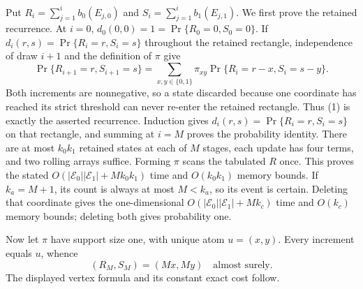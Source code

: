Put \(R_i=\sum_{j=1}^i b_0(E_{j,0})\) and \(S_i=\sum_{j=1}^i b_1(E_{j,1})\). We first prove the retained recurrence. At \(i=0\), \(d_0(0,0)=1=\Pr\{R_0=0,S_0=0\}\). If \(d_i(r,s)=\Pr\{R_i=r,S_i=s\}\) throughout the retained rectangle, independence of draw \(i+1\) and the definition of \(\pi\) give
\[
\Pr\{R_{i+1}=r,S_{i+1}=s\}=\sum_{x,y\in\{0,1\}}\pi_{xy}\Pr\{R_i=r-x,S_i=s-y\}.
\tag{1}
\]
Both increments are nonnegative, so a state discarded because one coordinate has reached its strict threshold can never re-enter the retained rectangle. Thus (1) is exactly the asserted recurrence. Induction gives \(d_i(r,s)=\Pr\{R_i=r,S_i=s\}\) on that rectangle, and summing at \(i=M\) proves the probability identity. There are at most \(k_0k_1\) retained states at each of \(M\) stages, each update has four terms, and two rolling arrays suffice. Forming \(\pi\) scans the tabulated \(R\) once. This proves the stated \(O(|\mathscr E_0||\mathscr E_1|+Mk_0k_1)\) time and \(O(k_0k_1)\) memory bounds. If \(k_a=M+1\), its count is always at most \(M<k_a\), so its event is certain. Deleting that coordinate gives the one-dimensional \(O(|\mathscr E_0||\mathscr E_1|+Mk_c)\) time and \(O(k_c)\) memory bounds; deleting both gives probability one.

Now let \(\pi\) have support size one, with unique atom \(u=(x,y)\). Every increment equals \(u\), whence
\[
(R_M,S_M)=(Mx,My)\quad\text{almost surely}.
\tag{2}
\]
The displayed vertex formula and its constant exact cost follow.

